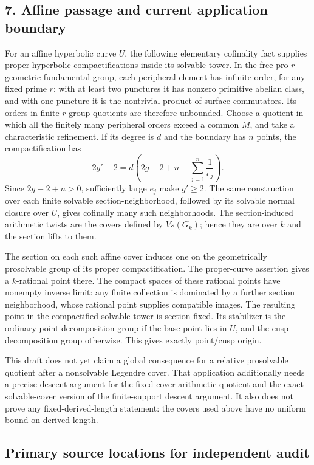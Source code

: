 \subsection*{7. Affine passage and current application boundary}

For an affine hyperbolic curve $U$, the following elementary
cofinality fact supplies proper hyperbolic compactifications inside
its solvable tower.  In the free pro-$r$ geometric fundamental
group, each peripheral element has infinite order, for any fixed
prime $r$: with at least two punctures it has nonzero primitive
abelian class, and with one puncture it is the nontrivial product
of surface commutators.  Its orders in finite $r$-group quotients
are therefore unbounded.  Choose a quotient in which all the
finitely many peripheral orders exceed a common $M$, and take a
characteristic refinement.  If its degree is $d$ and the boundary
has $n$ points, the compactification has
\[
     2g'-2=d\left(2g-2+n-\sum_{j=1}^{n}\frac1{e_j}\right).
\]
Since $2g-2+n>0$, sufficiently large $e_j$ make $g'\ge2$.
The same construction over each finite solvable section-neighborhood,
followed by its solvable normal closure over $U$, gives cofinally
many such neighborhoods.  The section-induced arithmetic twists
are the covers defined by $V s(G_k)$; hence they are over $k$ and
the section lifts to them.

The section on each such affine cover induces one on the
geometrically prosolvable group of its proper compactification.
The proper-curve assertion gives a $k$-rational point there.
The compact spaces of these rational points have nonempty inverse
limit: any finite collection is dominated by a further section
neighborhood, whose rational point supplies compatible images.
The resulting point in the compactified solvable tower is
section-fixed.  Its stabilizer is the ordinary point decomposition
group if the base point lies in $U$, and the cusp decomposition
group otherwise.  This gives exactly point/cusp origin.

This draft does not yet claim a global consequence for a relative
prosolvable quotient after a nonsolvable Legendre cover.  That
application additionally needs a precise descent argument for
the fixed-cover arithmetic quotient and the exact solvable-cover
version of the finite-support descent argument.  It also does
not prove any fixed-derived-length statement: the covers used
above have no uniform bound on derived length.

\subsection*{Primary source locations for independent audit}

